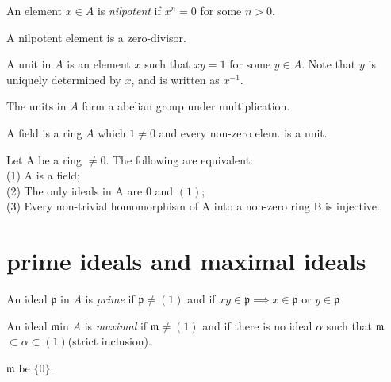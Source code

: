 \documentclass[11pt,fleqn]{book} %
\begin{document}
\begin{CJK}{UTF8}{gkai}
\begin{definition}
	[nilpotent] An element $x \in A$ is {\it nilpotent} if $x^n = 0$ for some $n > 0$.
\end{definition}
\begin{remark}
	A nilpotent element is a zero-divisor.
\end{remark}

\begin{definition}
	 A unit in $A$ is an element $x$ such that $xy = 1$ for some $y \in A$. Note that $y$ is uniquely determined by $x$, and is written as $x^{-1}$. 
\end{definition}
\begin{remark}
	The units in $A$ form a abelian group under multiplication.
\end{remark}

\begin{definition}
	[field] A field is a ring $A$ which $1 \neq 0$ and every non-zero elem. is a unit.
\end{definition}

\begin{proposition}
Let A be a ring $\neq 0$. The following are equivalent:\\
(1) A is a field;\\
(2) The only ideals in A are ${0}$ and $(1)$; \\
(3) Every non-trivial homomorphism of A into a non-zero ring B is injective.	
\end{proposition}

\section{prime ideals and maximal ideals}
\newcommand{\fp}{\mathfrak{p}}
\newcommand{\fm}{$\mathfrak{m}$}
\begin{definition}
	An ideal $\fp$ in $A$ is {\it prime} if $\fp \neq (1)$ and if $xy \in \fp \implies x\in \fp$ or $y \in \mathfrak{p}$ 
\end{definition}

\begin{definition}
	 An ideal \fm in $A$ is {\it maximal} if \fm $\neq (1)$ and if there is no ideal $\alpha $ such that \fm $\subset \alpha \subset (1)$(strict inclusion).
\end{definition}
\begin{remark}
	\fm {} be $\{0\}$.
\end{remark}


\end{CJK}
\end{document}
